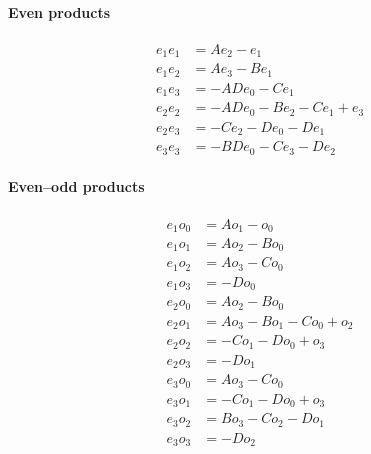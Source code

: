 \documentclass[11pt]{article}
\begin{document}
\paragraph{Even products}
\begin{align}
e_1 e_1 &=A e_{2} - e_{1}\tag{GB13a}\\
e_1 e_2 &=A e_{3} - B e_{1}\tag{GB13b}\\
e_1 e_3 &=- A D e_{0} - C e_{1}\tag{GB13c}\\
e_2 e_2 &=- A D e_{0} - B e_{2} - C e_{1} + e_{3}\tag{GB13d}\\
e_2 e_3 &=- C e_{2} - D e_{0} - D e_{1}\tag{GB13e}\\
e_3 e_3 &=- B D e_{0} - C e_{3} - D e_{2}\tag{GB13f}
\end{align}
\paragraph{Even--odd products}
\begin{align}
e_1 o_0 &=A o_{1} - o_{0}\tag{GB14a}\\
e_1 o_1 &=A o_{2} - B o_{0}\tag{GB14b}\\
e_1 o_2 &=A o_{3} - C o_{0}\tag{GB14c}\\
e_1 o_3 &=- D o_{0}\tag{GB14d}\\
e_2 o_0 &=A o_{2} - B o_{0}\tag{GB14e}\\
e_2 o_1 &=A o_{3} - B o_{1} - C o_{0} + o_{2}\tag{GB14f}\\
e_2 o_2 &=- C o_{1} - D o_{0} + o_{3}\tag{GB14g}\\
e_2 o_3 &=- D o_{1}\tag{GB14h}\\
e_3 o_0 &=A o_{3} - C o_{0}\tag{GB14i}\\
e_3 o_1 &=- C o_{1} - D o_{0} + o_{3}\tag{GB14j}\\
e_3 o_2 &=B o_{3} - C o_{2} - D o_{1}\tag{GB14k}\\
e_3 o_3 &=- D o_{2}\tag{GB14l}
\end{align}
\end{document}
